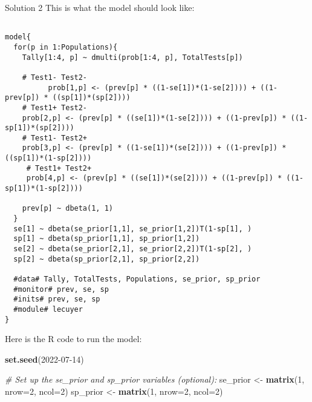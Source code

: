 \documentclass[
  ignorenonframetext,
]{beamer}
\newenvironment{Shaded}{\begin{snugshade}}{\end{snugshade}}
\newcommand{\AttributeTok}[1]{\textcolor[rgb]{0.13,0.29,0.53}{#1}}
\newcommand{\CommentTok}[1]{\textcolor[rgb]{0.56,0.35,0.01}{\textit{#1}}}
\newcommand{\DecValTok}[1]{\textcolor[rgb]{0.00,0.00,0.81}{#1}}
\newcommand{\FunctionTok}[1]{\textcolor[rgb]{0.13,0.29,0.53}{\textbf{#1}}}
\newcommand{\NormalTok}[1]{#1}
\newcommand{\OtherTok}[1]{\textcolor[rgb]{0.56,0.35,0.01}{#1}}
\begin{document}
\begin{frame}[fragile]
\begin{block}{Solution 2}
\protect\hypertarget{solution-2}{}
This is what the model should look like:

\scriptsize

\begin{verbatim}

model{
  for(p in 1:Populations){
    Tally[1:4, p] ~ dmulti(prob[1:4, p], TotalTests[p])
  
    # Test1- Test2-
          prob[1,p] <- (prev[p] * ((1-se[1])*(1-se[2]))) + ((1-prev[p]) * ((sp[1])*(sp[2])))
    # Test1+ Test2-
    prob[2,p] <- (prev[p] * ((se[1])*(1-se[2]))) + ((1-prev[p]) * ((1-sp[1])*(sp[2])))
    # Test1- Test2+
    prob[3,p] <- (prev[p] * ((1-se[1])*(se[2]))) + ((1-prev[p]) * ((sp[1])*(1-sp[2])))
     # Test1+ Test2+
     prob[4,p] <- (prev[p] * ((se[1])*(se[2]))) + ((1-prev[p]) * ((1-sp[1])*(1-sp[2])))

    prev[p] ~ dbeta(1, 1)
  }
  se[1] ~ dbeta(se_prior[1,1], se_prior[1,2])T(1-sp[1], )
  sp[1] ~ dbeta(sp_prior[1,1], sp_prior[1,2])
  se[2] ~ dbeta(se_prior[2,1], se_prior[2,2])T(1-sp[2], )
  sp[2] ~ dbeta(sp_prior[2,1], sp_prior[2,2])

  #data# Tally, TotalTests, Populations, se_prior, sp_prior
  #monitor# prev, se, sp
  #inits# prev, se, sp
  #module# lecuyer
}
\end{verbatim}
\end{block}

\begin{block}{\normalsize}
\protect\hypertarget{section}{}
Here is the R code to run the model:

\scriptsize

\begin{Shaded}
\begin{Highlighting}[]
\FunctionTok{set.seed}\NormalTok{(}\DecValTok{2022{-}07{-}14}\NormalTok{)}

\CommentTok{\# Set up the se\_prior and sp\_prior variables (optional):}
\NormalTok{se\_prior }\OtherTok{\textless{}{-}} \FunctionTok{matrix}\NormalTok{(}\DecValTok{1}\NormalTok{, }\AttributeTok{nrow=}\DecValTok{2}\NormalTok{, }\AttributeTok{ncol=}\DecValTok{2}\NormalTok{)}
\NormalTok{sp\_prior }\OtherTok{\textless{}{-}} \FunctionTok{matrix}\NormalTok{(}\DecValTok{1}\NormalTok{, }\AttributeTok{nrow=}\DecValTok{2}\NormalTok{, }\AttributeTok{ncol=}\DecValTok{2}\NormalTok{)}


\end{Highlighting}
\end{Shaded}
\end{block}
\end{frame}
\end{document}
